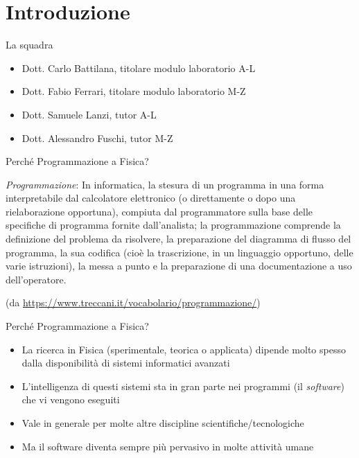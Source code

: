 
\section*{Introduzione}

\begin{frame}{La squadra}

  \begin{itemize}
  \item Dott. Carlo Battilana, titolare modulo laboratorio A-L
  \item Dott. Fabio Ferrari, titolare modulo laboratorio M-Z
  \item Dott. Samuele Lanzi, tutor A-L
  \item Dott. Alessandro Fuschi, tutor M-Z
  \end{itemize}

\end{frame}

\begin{frame}{Perché Programmazione a Fisica?}

  \textit{Programmazione}: In informatica, la stesura di un programma in una
  forma interpretabile dal calcolatore elettronico (o direttamente o dopo una
  rielaborazione opportuna), compiuta dal programmatore sulla base delle
  specifiche di programma fornite dall'analista; la programmazione comprende la
  definizione del problema da risolvere, la preparazione del diagramma di flusso
  del programma, la sua codifica (cioè la trascrizione, in un linguaggio
  opportuno, delle varie istruzioni), la messa a punto e la preparazione di una
  documentazione a uso dell'operatore.

  {\tiny (da \url{https://www.treccani.it/vocabolario/programmazione/})}

\end{frame}

\begin{frame}{Perché Programmazione a Fisica? \insertcontinuationtext}

  \begin{itemize}[<+->]
  \item La ricerca in Fisica (sperimentale, teorica o applicata) dipende
    molto spesso dalla disponibilità di sistemi informatici avanzati
  \item L'intelligenza di questi sistemi sta in gran parte nei programmi (il
    \textit{software}) che vi vengono eseguiti
  \item Vale in generale per molte altre discipline scientifiche/tecnologiche
  \item Ma il software diventa sempre più pervasivo in molte attività umane
  \end{itemize}

\end{frame}


